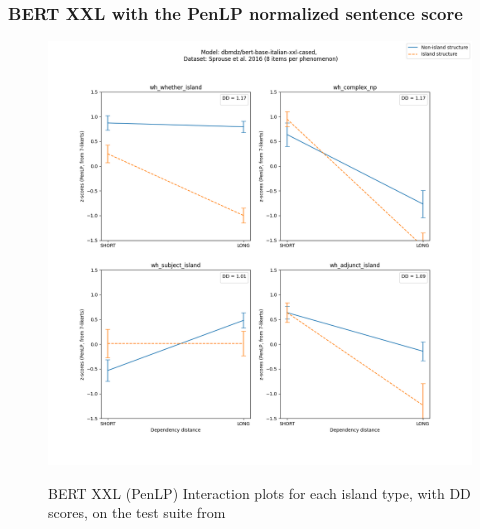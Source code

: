 \subsubsection{BERT XXL with the PenLP normalized sentence score}
\begin{figure}[h]
	\centering
	\includegraphics[width=1\textwidth]{images/AppendixA/Sprouse_wh_dbmdz_bert-base-italian-xxl-cased_PenLP-zscores-likert-2022-09-14_h17m26s15.png} 
	\label{A-fig:sprouse_bert_penlp}
	\caption{BERT XXL (PenLP) Interaction plots for each island type, with DD scores, on the test suite from \citet{sprouse2016experimental}}
\end{figure}
\clearpage
